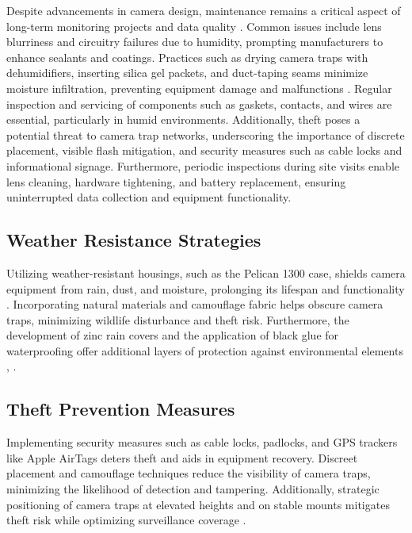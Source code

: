 \documentclass[class=report,11pt,crop=false]{standalone}
\begin{document}
Despite advancements in camera design, maintenance remains a critical aspect of long-term monitoring projects and data quality \cite{kays2009camera}. Common issues include lens blurriness and circuitry failures due to humidity, prompting manufacturers to enhance sealants and coatings. Practices such as drying camera traps with dehumidifiers, inserting silica gel packets, and duct-taping seams minimize moisture infiltration, preventing equipment damage and malfunctions \cite{glover2019camera}.  Regular inspection and servicing of components such as gaskets, contacts, and wires are essential, particularly in humid environments. Additionally, theft poses a potential threat to camera trap networks, underscoring the importance of discrete placement, visible flash mitigation, and security measures such as cable locks and informational signage. Furthermore, periodic inspections during site visits enable lens cleaning, hardware tightening, and battery replacement, ensuring uninterrupted data collection and equipment functionality. 

 
\subsection{Weather Resistance Strategies}

Utilizing weather-resistant housings, such as the Pelican 1300 case, shields camera equipment from rain, dust, and moisture, prolonging its lifespan and functionality \cite{kays2009camera}. Incorporating natural materials and camouflage fabric helps obscure camera traps, minimizing wildlife disturbance and theft risk. Furthermore, the development of zinc rain covers and the application of black glue for waterproofing offer additional layers of protection against environmental elements \cite{kays2009camera}, \cite{glover2019camera}. 


\subsection{Theft Prevention Measures} 

Implementing security measures such as cable locks, padlocks, and GPS trackers like Apple AirTags deters theft and aids in equipment recovery. Discreet placement and camouflage techniques reduce the visibility of camera traps, minimizing the likelihood of detection and tampering. Additionally, strategic positioning of camera traps at elevated heights and on stable mounts mitigates theft risk while optimizing surveillance coverage \cite{kays2009camera}. 
\end{document}
